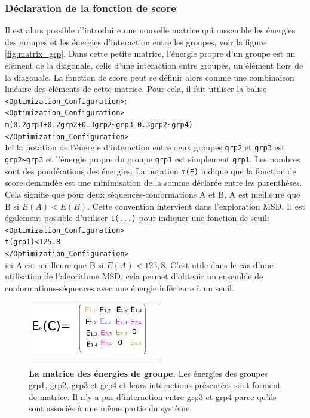 \subsubsection{Déclaration de la fonction de score}
\label{sub:score}
Il est alors possible d'introduire une nouvelle matrice qui rassemble les énergies des groupes et les énergies d'interaction entre les groupes, voir la figure \ref{fig:matrix_grp}. Dans cette petite matrice, l'énergie propre d'un groupe est un élément de la diagonale, celle d'une interaction entre groupes, un élément hors de la diagonale. La fonction de score peut se définir alors comme une combinaison linéaire des éléments de cette matrice. Pour cela, il fait utiliser la balise  \verb!<Optimization_Configuration>!:\\
\verb!<Optimization_Configuration>! \\
\verb!m(0.2grp1+0.2grp2+0.3grp2~grp3-0.3grp2~grp4)! \\
\verb!</Optimization_Configuration>! \\
Ici la notation de l'énergie d'interaction entre deux groupes \verb!grp2! et \verb!grp3! est \verb!grp2~grp3! et l'énergie propre du groupe \verb!grp1! est simplement \verb!grp1!. Les nombres sont des pondérations des énergies. La notation \verb!m(E)! indique que la fonction de score demandée est une minimisation de la somme déclarée entre les parenthèses. Cela signifie que pour deux séquences-conformations A et B, A est meilleure que B si $E(A) < E(B)$. Cette convention intervient dans l'exploration MSD. Il est également possible d'utiliser \verb!t(...)! pour indiquer une fonction de seuil:\\
\verb!<Optimization_Configuration>! \\
\verb!t(grp1)<125.8! \\
\verb!</Optimization_Configuration>! \\
ici A est meilleure que B si $E(A)<125,8$. C'est utile dans le cas d'une utilisation de l'algorithme MSD, cela permet d'obtenir un ensemble de conformations-séquences avec une énergie inférieure à un seuil.
\begin{figure}[!htbp]
  \centering
  \begin{tabular}{cc}
    \includegraphics[width=5cm]{figure/group_matrix.png} &
  \end{tabular}
  
  \caption{\textbf{La matrice des énergies de groupe.} Les énergies des groupes grp1, grp2, grp3 et grp4 et leurs interactions présentées sont forment de matrice. Il n'y a pas d'interaction entre grp3 et grp4 parce qu'ils sont associés à une même partie du système.}
  \label{fig:groupmatrix}
\end{figure}

